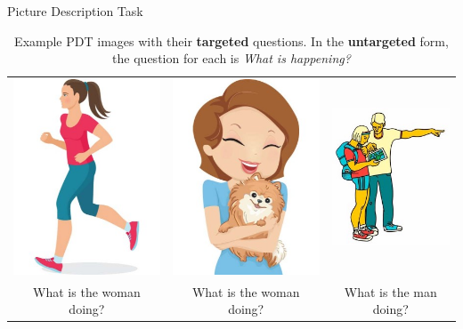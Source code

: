 \documentclass[final,t]{beamer}
\begin{document}
\begin{frame}{}
\begin{columns}[t]
\begin{column}{.33\linewidth}
\begin{block}{Picture Description Task}
\begin{center}
\begin{minipage}{.85\textwidth}
\begin{table}[htb!]
\begin{center}
\begin{tabular}{|c|c|c|}
{\includegraphics[width=0.29\columnwidth]{../figures/I30.jpg}} & {\includegraphics[width=0.3\columnwidth]{../figures/I29.jpg}} & {\includegraphics[width=0.3\columnwidth]{../figures/I28.jpg}} \\
What is the woman doing? & What is the woman doing? & What is the man doing? \\
\hline
\end{tabular}
\medskip
\caption{\label{tab:example-pdt-items} Example PDT images with their \textbf{targeted} questions. In the \textbf{untargeted} form, the question for each is \textit{What is happening?}} %
\end{center}
\end{table}


\end{minipage}
\end{center}
\end{block}
\end{column}
\end{columns}
\end{frame}
\end{document}
